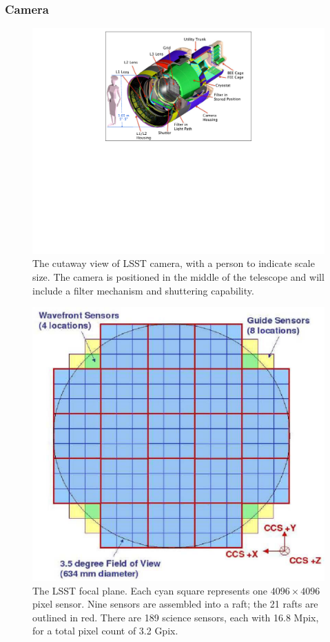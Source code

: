 \documentclass{emulateapj}
\begin{document}
\vskip 0.2in
\subsubsection{ Camera }


\begin{figure}[t!]
\hskip -1.7in
\includegraphics[width=1.55\hsize,angle=90.0,clip]{camera2009.pdf}
\vskip -2.5in
\caption{The cutaway view of LSST camera, with a person to indicate scale size. 
The camera is positioned in the middle of the telescope and will include a filter 
mechanism and shuttering capability.} 
\label{Fig:camera}
\end{figure}


\begin{figure}[ht]
\includegraphics[width=1.0\hsize,clip]{fov.pdf}
\caption{The LSST focal plane. Each cyan square represents one
$4096\times4096$ pixel sensor. Nine sensors are assembled into a
raft; the 21 rafts are outlined in red. There are 189 science sensors, each 
with 16.8 Mpix, for a total pixel count of 3.2 Gpix.} 
\label{Fig:fov}
\end{figure}
\end{document}
